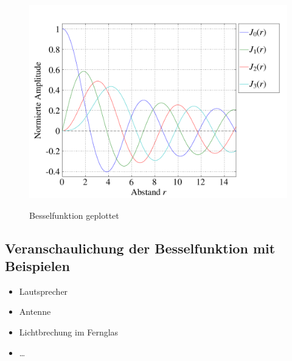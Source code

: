 \begin{refsection}
\begin{figure}
	\begin{center}
		\includegraphics[scale=0.5]{kreis/besselfunction.pdf}
		\label{img:besselfunction}
		\caption[Besselfunktion]{Besselfunktion geplottet}
	\end{center}
\end{figure}

\newpage

\subsection{Veranschaulichung der Besselfunktion mit Beispielen}
\begin{itemize}
	\item Lautsprecher
	\item Antenne
	\item Lichtbrechung im Fernglas
	\item \dots
\end{itemize}

\printbibliography[heading=subbibliography]
\end{refsection}

